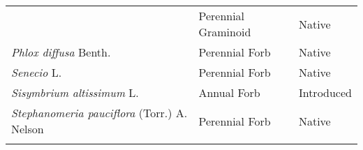 \documentclass[8pt,]{article}
\begin{document}
\begin{longtable}[]{@{}lll@{}}
\begin{minipage}[t]{0.49\columnwidth}
\end{minipage} & \begin{minipage}[t]{0.27\columnwidth}\raggedright\strut
Perennial Graminoid\strut
\end{minipage} & \begin{minipage}[t]{0.15\columnwidth}\raggedright\strut
Native\strut
\end{minipage}\tabularnewline
\begin{minipage}[t]{0.49\columnwidth}\raggedright\strut
\emph{Phlox diffusa} Benth.\strut
\end{minipage} & \begin{minipage}[t]{0.27\columnwidth}\raggedright\strut
Perennial Forb\strut
\end{minipage} & \begin{minipage}[t]{0.15\columnwidth}\raggedright\strut
Native\strut
\end{minipage}\tabularnewline
\begin{minipage}[t]{0.49\columnwidth}\raggedright\strut
\emph{Senecio} L.\strut
\end{minipage} & \begin{minipage}[t]{0.27\columnwidth}\raggedright\strut
Perennial Forb\strut
\end{minipage} & \begin{minipage}[t]{0.15\columnwidth}\raggedright\strut
Native\strut
\end{minipage}\tabularnewline
\begin{minipage}[t]{0.49\columnwidth}\raggedright\strut
\emph{Sisymbrium altissimum} L.\strut
\end{minipage} & \begin{minipage}[t]{0.27\columnwidth}\raggedright\strut
Annual Forb\strut
\end{minipage} & \begin{minipage}[t]{0.15\columnwidth}\raggedright\strut
Introduced\strut
\end{minipage}\tabularnewline
\begin{minipage}[t]{0.49\columnwidth}\raggedright\strut
\emph{Stephanomeria pauciflora} (Torr.) A. Nelson\strut
\end{minipage} & \begin{minipage}[t]{0.27\columnwidth}\raggedright\strut
Perennial Forb\strut
\end{minipage} & \begin{minipage}[t]{0.15\columnwidth}\raggedright\strut
Native\strut
\end{minipage}\tabularnewline
\begin{minipage}[t]{0.49\columnwidth}\raggedright\strut

\end{minipage}
\end{longtable}
\end{document}
